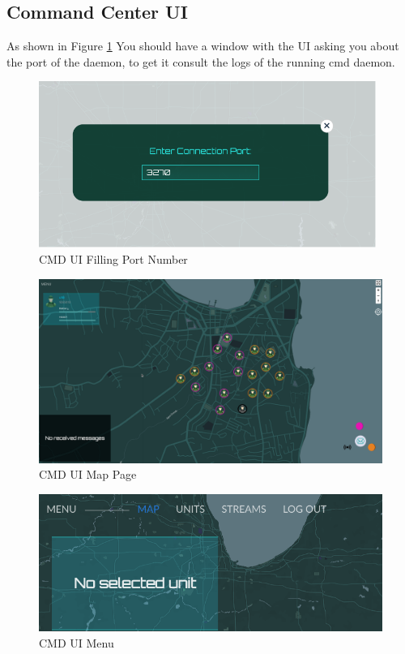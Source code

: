 \subsection{Command Center UI} 
\label{subsec:cmdui-usage}

As shown in Figure \ref{fig:cmd-ui-port} You should have a window with the UI asking you about the port of the daemon, to get it consult the logs of the running cmd daemon.

\begin{figure}[!htb]
    \centering
    \includegraphics[width=11cm]{images/cmd-ui-port.png}
    \caption{CMD UI Filling Port Number}
    \label{fig:cmd-ui-port}
\end{figure}

\begin{figure}[!htb]
    \centering
    \includegraphics[width=\linewidth]{images/cmd-ui-map.png}
    \caption{CMD UI Map Page}
    \label{fig:cmd-ui-map}
\end{figure}

\begin{figure}[!htb]
    \centering
    \includegraphics[width=\linewidth]{images/cmd-ui-menu.png}
    \caption{CMD UI Menu}
    \label{fig:cmd-ui-menu}
\end{figure}

